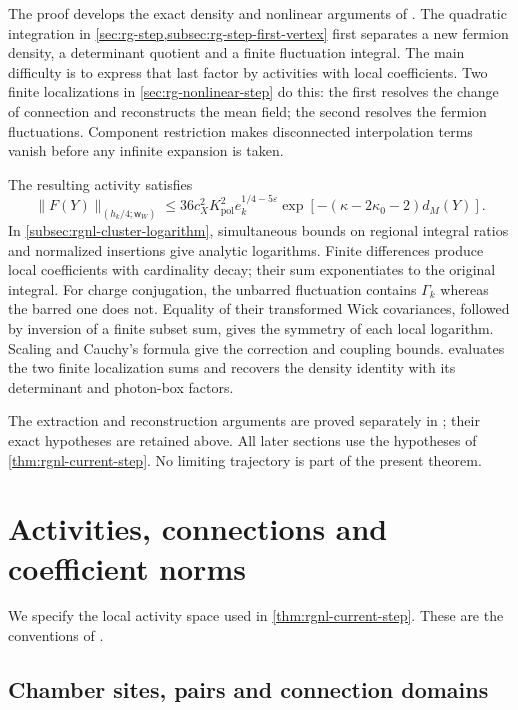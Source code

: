 The proof develops the exact density and nonlinear arguments of
\cite[\S\S13--14]{QED3Master}. The quadratic integration in \cref{sec:rg-step,subsec:rg-step-first-vertex} first
separates a new fermion density, a determinant quotient and a finite
fluctuation integral. The main difficulty is to express that last
factor by activities with local coefficients. Two finite
localizations in \cref{sec:rg-nonlinear-step} do this: the first resolves the change of connection
and reconstructs the mean field; the second resolves the fermion
fluctuations. Component restriction makes disconnected interpolation
terms vanish before any infinite expansion is taken.

The resulting activity satisfies
\[
 \|F(Y)\|_{(h_k/4;\mathsf w_W)}
 \le36c_X^2K_{\mathrm{pol}}^2e_k^{1/4-5\varepsilon}
                 \exp[-(\kappa-2\kappa_0-2)d_M(Y)].
\]
In \cref{subsec:rgnl-cluster-logarithm}, simultaneous bounds on
regional integral ratios and normalized insertions give analytic
logarithms. Finite differences produce local coefficients with
cardinality decay; their sum exponentiates to the original integral.
For charge conjugation, the unbarred fluctuation contains $\Gamma_k$ whereas
the barred one does not. Equality of their transformed Wick
covariances, followed by inversion of a finite subset sum, gives
the symmetry of each local logarithm. Scaling and Cauchy's formula
give the correction and coupling bounds. 
evaluates the two finite localization sums and recovers the density
identity with its determinant and photon-box factors.

The extraction and reconstruction arguments are proved separately in
\cite{NormalizedContraction}; their exact hypotheses are retained
above. All later sections use the
hypotheses of \cref{thm:rgnl-current-step}. No limiting trajectory is
part of the present theorem.
\section{Activities, connections and coefficient norms}
\label{sec:activities}

We specify the local activity space used in \cref{thm:rgnl-current-step}.
These are the conventions of \cite[\S2]{NormalizedContraction}.

\subsection{Chamber sites, pairs and connection domains}

